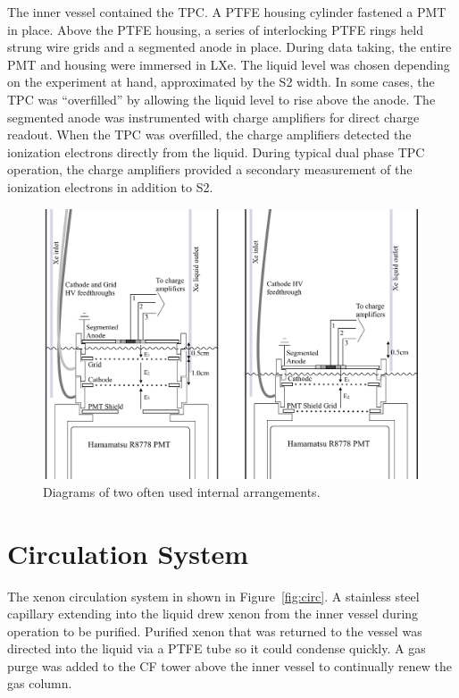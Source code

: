 The inner vessel contained the \ac{TPC}. A PTFE housing cylinder fastened a PMT in place. Above the PTFE housing, a series of interlocking PTFE rings held strung wire grids and a segmented anode in place. During data taking, the entire PMT and housing were immersed in \ac{LXe}. The liquid level was chosen depending on the experiment at hand, approximated by the S2 width. In some cases, the TPC was ``overfilled'' by allowing the liquid level to rise above the anode. The segmented anode was instrumented with charge amplifiers for direct charge readout. When the \ac{TPC} was overfilled, the charge amplifiers detected the ionization electrons directly from the liquid. During typical dual phase \ac{TPC} operation, the charge amplifiers provided a secondary measurement of the ionization electrons in addition to S2.

\begin{figure}[htbp]
\begin{center}
\includegraphics[width=\textwidth]{figures/testbed/internals_1and2.png}
\caption{Diagrams of two often used internal arrangements. }
\label{fig:internals}
\end{center}
\end{figure}


\section{Circulation System}
The xenon circulation system in shown in Figure~\ref{fig:circ}. A stainless steel capillary extending into the liquid drew xenon from the inner vessel during operation to be purified. Purified xenon that was returned to the vessel was directed into the liquid via a PTFE tube so it could condense quickly. A gas purge was added to the \ac{CF} tower above the inner vessel to continually renew the gas column. 

